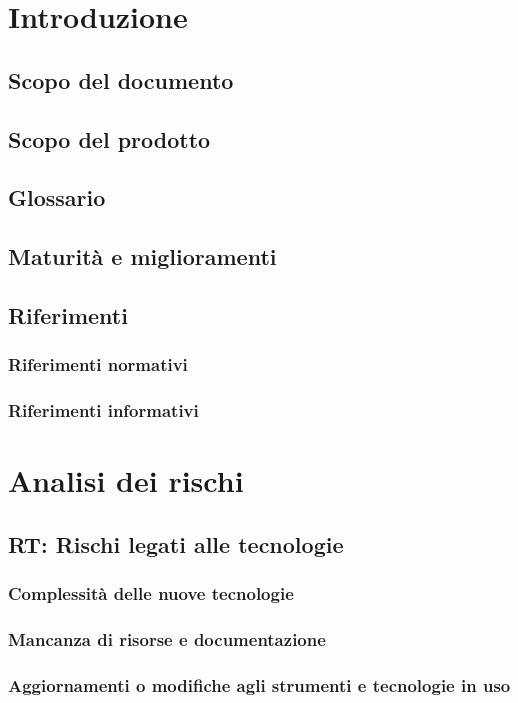 
\tableofcontents
\section{Introduzione}
\subsection{Scopo del documento}
\subsection{Scopo del prodotto}
\subsection{Glossario}
\subsection{Maturità e miglioramenti}
\subsection{Riferimenti}
\subsubsection{Riferimenti normativi}
\subsubsection{Riferimenti informativi}

\section{Analisi dei rischi}
\subsection{RT: Rischi legati alle tecnologie}
\subsubsection{Complessità delle nuove tecnologie}
\subsubsection{Mancanza di risorse e documentazione}
\subsubsection{Aggiornamenti o modifiche agli strumenti e tecnologie in uso}
